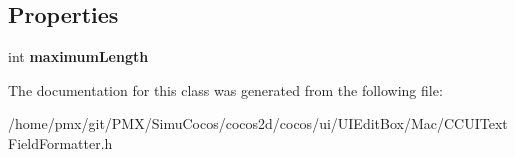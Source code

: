 \subsection*{Properties}
\begin{DoxyCompactItemize}
\item 
\mbox{\label{interfaceCCUITextFieldFormatter_a334630a19f8308d8de64a9856d9c7dce}} 
int {\bfseries maximum\+Length}
\end{DoxyCompactItemize}


The documentation for this class was generated from the following file\+:\begin{DoxyCompactItemize}
\item 
/home/pmx/git/\+P\+M\+X/\+Simu\+Cocos/cocos2d/cocos/ui/\+U\+I\+Edit\+Box/\+Mac/C\+C\+U\+I\+Text\+Field\+Formatter.\+h\end{DoxyCompactItemize}
